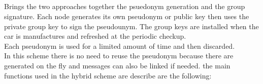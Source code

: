 \subsection{\hybrid}
Brings the two approaches together the psuedonym generation and the group signature. Each node generates its own
pseudonym or public key then uses the private group key to sign the pseudounym. The group keys are installed when the car is manufactures and refreshed at the periodic checkup.\\
Each pseudonym is used for a limited amount of time and then discarded.\\
In this scheme there is no need to reuse the pseudonym because there are generated on the fly and messages can also be linked if needed.  
the main functions used in the hybrid scheme are describe are the following:

